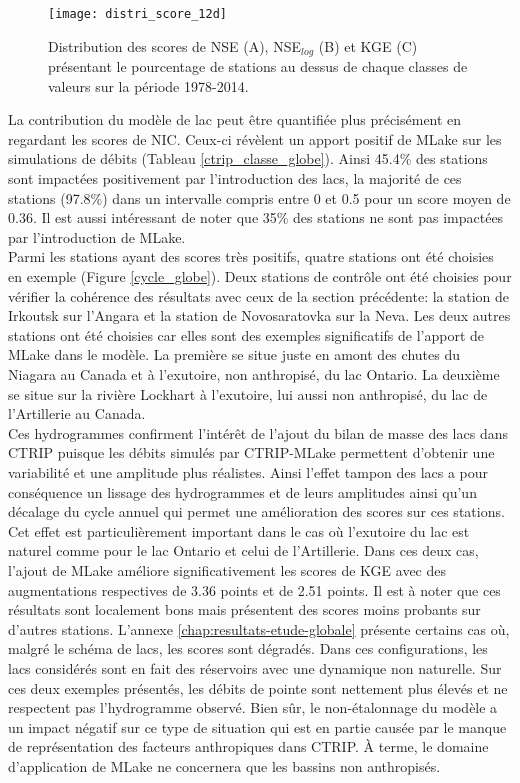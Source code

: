 \begin{figure}[h!]
\texttt{[image: distri\_score\_12d]}
\caption{Distribution des scores de NSE (A), NSE$_{log}$ (B) et KGE (C) présentant le pourcentage de stations au dessus de chaque classes de valeurs sur la période 1978-2014.}
\label{ctrip_globe}
\end{figure}

La contribution du modèle de lac peut être quantifiée plus précisément en regardant les scores de NIC. Ceux-ci révèlent un apport positif de MLake sur les simulations de débits (Tableau \ref{ctrip_classe_globe}). Ainsi 45.4\% des stations sont impactées positivement par l'introduction des lacs, la majorité de ces stations (97.8\%) dans un intervalle compris entre 0 et 0.5 pour un score moyen de 0.36. Il est aussi intéressant de noter que 35\% des stations ne sont pas impactées par l'introduction de MLake.\\

Parmi les stations ayant des scores très positifs, quatre stations ont été choisies en exemple (Figure \ref{cycle_globe}). Deux stations de contrôle ont été choisies pour vérifier la cohérence des résultats avec ceux de la section précédente: la station de Irkoutsk sur l'Angara et la station de Novosaratovka sur la Neva. Les deux autres stations ont été choisies car elles sont des exemples significatifs de l'apport de MLake dans le modèle. La première se situe juste en amont des chutes du Niagara au Canada et à l'exutoire, non anthropisé, du lac Ontario. La deuxième se situe sur la rivière Lockhart à l'exutoire, lui aussi non anthropisé, du lac de l'Artillerie au Canada. \\
Ces hydrogrammes confirment l'intérêt de l'ajout du bilan de masse des lacs dans CTRIP puisque les débits simulés par CTRIP-MLake permettent d'obtenir une variabilité et une amplitude plus réalistes. Ainsi l'effet tampon des lacs a pour conséquence un lissage des hydrogrammes et de leurs amplitudes ainsi qu'un décalage du cycle annuel qui permet une amélioration des scores sur ces stations. Cet effet est particulièrement important dans le cas où l'exutoire du lac est naturel comme pour le lac Ontario et celui de l'Artillerie. Dans ces deux cas, l'ajout de MLake améliore significativement les scores de KGE avec des augmentations respectives de 3.36 points et de 2.51 points. Il est à noter que ces résultats sont localement bons mais présentent des scores moins probants sur d'autres stations. L'annexe \ref{chap:resultats-etude-globale} présente certains cas où, malgré le schéma de lacs, les scores sont dégradés. Dans ces configurations, les lacs considérés sont en fait des réservoirs avec une dynamique non naturelle. Sur ces deux exemples présentés, les débits de pointe sont nettement plus élevés et ne respectent pas l'hydrogramme observé. Bien sûr, le non-étalonnage du modèle a un impact négatif sur ce type de situation qui est en partie causée par le manque de représentation des facteurs anthropiques dans CTRIP. À terme, le domaine d'application de MLake ne concernera que les bassins non anthropisés.

